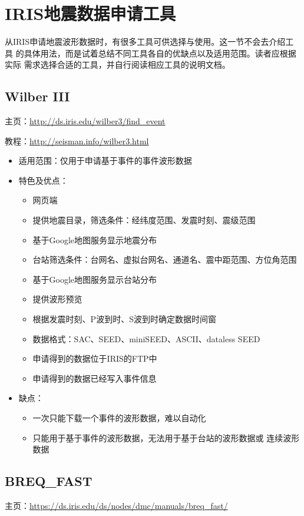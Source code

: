 \section{IRIS地震数据申请工具}
从IRIS申请地震波形数据时，有很多工具可供选择与使用。这一节不会去介绍工具
的具体用法，而是试着总结不同工具各自的优缺点以及适用范围。读者应根据实际
需求选择合适的工具，并自行阅读相应工具的说明文档。

\subsection{Wilber III}
主页：\url{http://ds.iris.edu/wilber3/find_event}

教程：\url{http://seisman.info/wilber3.html}

\begin{itemize}
\item 适用范围：仅用于申请基于事件的事件波形数据
\item 特色及优点：
    \begin{itemize}
    \item 网页端
    \item 提供地震目录，筛选条件：经纬度范围、发震时刻、震级范围
    \item 基于Google地图服务显示地震分布
    \item 台站筛选条件：台网名、虚拟台网名、通道名、震中距范围、方位角范围
    \item 基于Google地图服务显示台站分布
    \item 提供波形预览
    \item 根据发震时刻、P波到时、S波到时确定数据时间窗
    \item 数据格式：SAC、SEED、miniSEED、ASCII、dataless SEED
    \item 申请得到的数据位于IRIS的FTP中
    \item 申请得到的数据已经写入事件信息
    \end{itemize}
\item 缺点：
    \begin{itemize}
    \item 一次只能下载一个事件的波形数据，难以自动化
    \item 只能用于基于事件的波形数据，无法用于基于台站的波形数据或
        连续波形数据
    \end{itemize}
\end{itemize}

\subsection{BREQ\_FAST}
主页：\url{https://ds.iris.edu/ds/nodes/dmc/manuals/breq_fast/}

